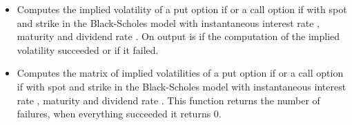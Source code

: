 \begin{itemize}
\item 
  \sshortdescribe Computes the implied volatility of a put option if
   or a call option if  with spot  and
  strike  in the Black-Scholes model with instantaneous interest rate
  , maturity  and dividend rate . On output
   is  if the computation of the implied volatility succeeded
  or  if it failed.

\item 
  \sshortdescribe Computes the matrix of implied volatilities 
  of a put option if  or a call option if
   with spot  and strike  in the
  Black-Scholes model with instantaneous interest rate , maturity
   and dividend rate . This function returns the number
  of failures, when everything succeeded it returns $0$.
\end{itemize}

